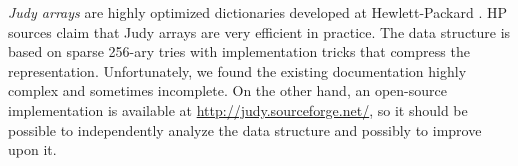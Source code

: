 \emph{Judy arrays} are highly optimized dictionaries developed at
Hewlett-Packard \cite{judy-shop-manual, judy-patent}.
HP sources claim that Judy arrays are very efficient in practice.
The data structure is based on sparse 256-ary tries with implementation tricks
that compress the representation.
Unfortunately, we found the existing documentation highly complex and sometimes
incomplete. On the other hand, an open-source implementation is available
at \url{http://judy.sourceforge.net/}, so it should be possible to independently
analyze the data structure and possibly to improve upon it.
